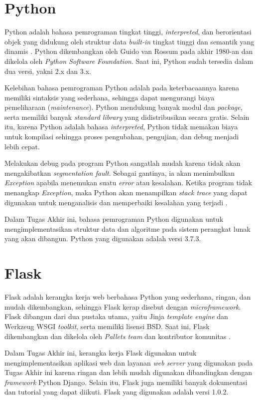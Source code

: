 \section{Python}
\tab Python adalah bahasa pemrograman tingkat tinggi, \textit{interpreted}, dan berorientasi objek yang didukung oleh struktur data \textit{built-in} tingkat tinggi dan semantik yang dinamis \cite{python}. Python dikembangkan oleh Guido van Rossum pada akhir 1980-an dan dikelola oleh \textit{Python Software Foundation}. Saat ini, Python sudah tersedia dalam dua versi, yakni 2.x dan 3.x.

Kelebihan bahasa pemrograman Python adalah pada keterbacaannya karena memiliki sintaksis yang sederhana, sehingga dapat mengurangi biaya pemeliharaan (\textit{maintenance}). Python mendukung banyak modul dan \textit{package}, serta memiliki banyak \textit{standard library} yang didistribusikan secara gratis. Selain itu, karena Python adalah bahasa \textit{interpreted}, Python tidak memakan biaya untuk kompilasi sehingga proses pengubahan, pengujian, dan debug menjadi lebih cepat.

Melakukan debug pada program Python sangatlah mudah karena tidak akan mengakibatkan \textit{segmentation fault}. Sebagai gantinya, ia akan menimbulkan \textit{Exception} apabila menemukan suatu \textit{error} atau kesalahan. Ketika program tidak menangkap \textit{Exception}, maka Python akan menampilkan \textit{stack trace} yang dapat digunakan untuk menganalisis dan memperbaiki kesalahan yang terjadi \cite{python}.

Dalam Tugas Akhir ini, bahasa pemrograman Python digunakan untuk mengimplementasikan struktur data dan algoritme pada sistem perangkat lunak yang akan dibangun. Python yang digunakan adalah versi 3.7.3.

\section{Flask}
\tab Flask adalah kerangka kerja web berbahasa Python yang sederhana, ringan, dan mudah dikembangkan, sehingga Flask kerap disebut dengan \textit{microframework}. Flask dibangun dari dua pustaka utama, yaitu Jinja \textit{template engine} dan Werkzeug WSGI \textit{toolkit}, serta memiliki lisensi BSD. Saat ini, Flask dikembangkan dan dikelola oleh \textit{Pallets team} dan kontributor komunitas \cite{flask}.

\pagebreak
Dalam Tugas Akhir ini, kerangka kerja Flask digunakan untuk mengimplementasikan aplikasi web dan layanan \textit{web server} yang digunakan pada Tugas Akhir ini karena ringan dan lebih mudah digunakan dibandingkan dengan \textit{framework} Python Django. Selain itu, Flask juga memiliki banyak dokumentasi dan tutorial yang dapat diikuti. Flask yang digunakan adalah versi 1.0.2.

